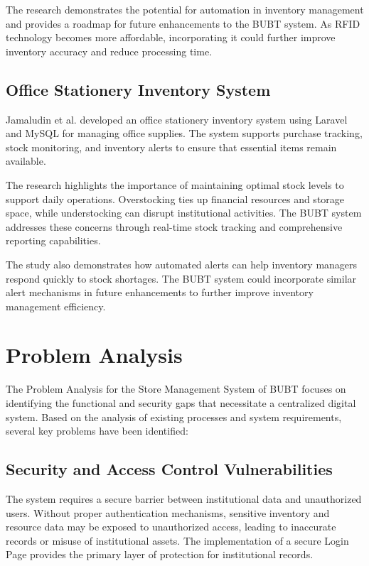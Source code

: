 The research demonstrates the potential for automation in inventory management and provides a roadmap for future enhancements to the BUBT system. As RFID technology becomes more affordable, incorporating it could further improve inventory accuracy and reduce processing time.

\subsection{Office Stationery Inventory System}

Jamaludin et al. \cite{office_inventory} developed an office stationery inventory system using Laravel and MySQL for managing office supplies. The system supports purchase tracking, stock monitoring, and inventory alerts to ensure that essential items remain available.

The research highlights the importance of maintaining optimal stock levels to support daily operations. Overstocking ties up financial resources and storage space, while understocking can disrupt institutional activities. The BUBT system addresses these concerns through real-time stock tracking and comprehensive reporting capabilities.

The study also demonstrates how automated alerts can help inventory managers respond quickly to stock shortages. The BUBT system could incorporate similar alert mechanisms in future enhancements to further improve inventory management efficiency.

\section{Problem Analysis}

The Problem Analysis for the Store Management System of BUBT focuses on identifying the functional and security gaps that necessitate a centralized digital system. Based on the analysis of existing processes and system requirements, several key problems have been identified:

\subsection{Security and Access Control Vulnerabilities}

The system requires a secure barrier between institutional data and unauthorized users. Without proper authentication mechanisms, sensitive inventory and resource data may be exposed to unauthorized access, leading to inaccurate records or misuse of institutional assets. The implementation of a secure Login Page provides the primary layer of protection for institutional records.

